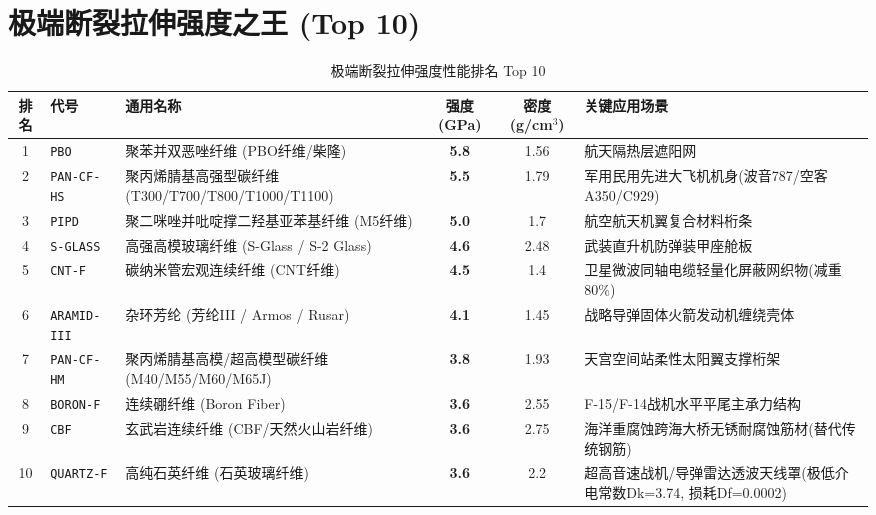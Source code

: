 \documentclass[11pt,openright,twoside,UTF8]{ctexbook}
\begin{document}
\section{极端断裂拉伸强度之王 (Top 10)}
\begin{table}[htbp]
\centering
\small
\caption{极端断裂拉伸强度性能排名 Top 10}
\begin{tabularx}{\textwidth}{cp{2.2cm}p{4.2cm}ccp{3.5cm}}
\toprule
\textbf{排名} & \textbf{代号} & \textbf{通用名称} & \textbf{强度 (GPa)} & \textbf{密度 (g/cm$^3$)} & \textbf{关键应用场景} \\
\midrule
1 & \texttt{PBO} & 聚苯并双恶唑纤维 (PBO纤维/柴隆) & \textbf{5.8} & 1.56 & 航天隔热层遮阳网 \\ 
2 & \texttt{PAN-CF-HS} & 聚丙烯腈基高强型碳纤维 (T300/T700/T800/T1000/T1100) & \textbf{5.5} & 1.79 & 军用民用先进大飞机机身(波音787/空客A350/C929) \\ 
3 & \texttt{PIPD} & 聚二咪唑并吡啶撑二羟基亚苯基纤维 (M5纤维) & \textbf{5.0} & 1.7 & 航空航天机翼复合材料桁条 \\ 
4 & \texttt{S-GLASS} & 高强高模玻璃纤维 (S-Glass / S-2 Glass) & \textbf{4.6} & 2.48 & 武装直升机防弹装甲座舱板 \\ 
5 & \texttt{CNT-F} & 碳纳米管宏观连续纤维 (CNT纤维) & \textbf{4.5} & 1.4 & 卫星微波同轴电缆轻量化屏蔽网织物(减重80\%) \\ 
6 & \texttt{ARAMID-III} & 杂环芳纶 (芳纶III / Armos / Rusar) & \textbf{4.1} & 1.45 & 战略导弹固体火箭发动机缠绕壳体 \\ 
7 & \texttt{PAN-CF-HM} & 聚丙烯腈基高模/超高模型碳纤维 (M40/M55/M60/M65J) & \textbf{3.8} & 1.93 & 天宫空间站柔性太阳翼支撑桁架 \\ 
8 & \texttt{BORON-F} & 连续硼纤维 (Boron Fiber) & \textbf{3.6} & 2.55 & F-15/F-14战机水平平尾主承力结构 \\ 
9 & \texttt{CBF} & 玄武岩连续纤维 (CBF/天然火山岩纤维) & \textbf{3.6} & 2.75 & 海洋重腐蚀跨海大桥无锈耐腐蚀筋材(替代传统钢筋) \\ 
10 & \texttt{QUARTZ-F} & 高纯石英纤维 (石英玻璃纤维) & \textbf{3.6} & 2.2 & 超高音速战机/导弹雷达透波天线罩(极低介电常数Dk=3.74, 损耗Df=0.0002) \\ 
\bottomrule
\end{tabularx}
\end{table}
\end{document}
